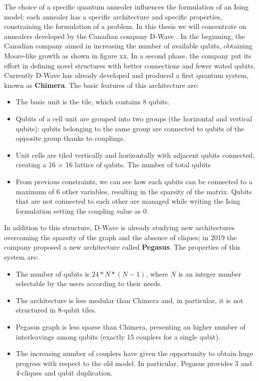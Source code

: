 The choice of a specific quantum annealer influences the formulation of an Ising model: each annealer has a specific architecture and specific properties, constraining the formulation of a problem. In this thesis we will concentrate on annealers developed by the Canadian company D-Wave \cite{Dwave}. In the beginning, the Canadian company aimed in increasing the number of available qubits, obtaining Moore-like growth as shown in figure xx. In a second phase, the company put its effort in defining novel structures with better connections and fewer wated qubits. Currently D-Wave has already developed and produced a first quantum system, known as \textbf{Chimera}. The basic features of this architecture are:

\begin{itemize}
    \item The basic unit is the tile, which contains 8 qubits.
    \item Qubits of a cell unit are grouped into two groups (the horizontal and vertical qubits): qubits belonging to the same group are connected to qubits of the opposite group thanks to couplings.
    \item Unit cells are tiled vertically and horizontally with adjacent qubits connected, creating a 16 $\times$ 16 lattice of qubits. The number of total qubits 
    \item From previous constraints, we can see how each qubits can be connected to a maximum of 6 other variables, resulting in the sparsity of the matrix. Qubits that are not connected to each other are managed while writing the Ising formulation setting the coupling value as 0.
\end{itemize}

In addition to this structure, D-Wave is already studying new architectures overcoming the sparsity of the graph and the absence of cliques; in 2019 the company proposed a new architecture called \textbf{Pegasus}. The properties of this system are:

\begin{itemize}
    \item The number of qubits is $24*N*(N-1)$, where $N$ is an integer number selectable by the users according to their needs.
    \item The architecture is less modular than Chimera and, in particular, it is not structured in 8-qubit tiles.
    \item Pegasus graph is less sparse than Chimera, presenting an higher number of interleavings among qubits (exactly 15 couplers for a single qubit).
    \item The increasing number of couplers have given the opportunity to obtain huge progress with respect to the old model. In particular, Pegasus provides 3 and 4-cliques and qubit duplication.
\end{itemize}

